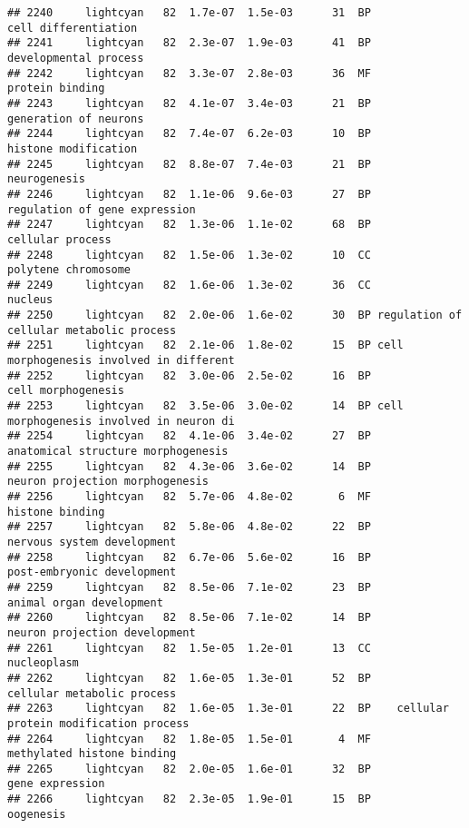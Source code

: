 \documentclass[]{article}
\begin{document}
\begin{verbatim}
## 2240     lightcyan   82  1.7e-07  1.5e-03      31  BP                     cell differentiation
## 2241     lightcyan   82  2.3e-07  1.9e-03      41  BP                    developmental process
## 2242     lightcyan   82  3.3e-07  2.8e-03      36  MF                          protein binding
## 2243     lightcyan   82  4.1e-07  3.4e-03      21  BP                    generation of neurons
## 2244     lightcyan   82  7.4e-07  6.2e-03      10  BP                     histone modification
## 2245     lightcyan   82  8.8e-07  7.4e-03      21  BP                             neurogenesis
## 2246     lightcyan   82  1.1e-06  9.6e-03      27  BP            regulation of gene expression
## 2247     lightcyan   82  1.3e-06  1.1e-02      68  BP                         cellular process
## 2248     lightcyan   82  1.5e-06  1.3e-02      10  CC                      polytene chromosome
## 2249     lightcyan   82  1.6e-06  1.3e-02      36  CC                                  nucleus
## 2250     lightcyan   82  2.0e-06  1.6e-02      30  BP regulation of cellular metabolic process
## 2251     lightcyan   82  2.1e-06  1.8e-02      15  BP cell morphogenesis involved in different
## 2252     lightcyan   82  3.0e-06  2.5e-02      16  BP                       cell morphogenesis
## 2253     lightcyan   82  3.5e-06  3.0e-02      14  BP cell morphogenesis involved in neuron di
## 2254     lightcyan   82  4.1e-06  3.4e-02      27  BP       anatomical structure morphogenesis
## 2255     lightcyan   82  4.3e-06  3.6e-02      14  BP          neuron projection morphogenesis
## 2256     lightcyan   82  5.7e-06  4.8e-02       6  MF                          histone binding
## 2257     lightcyan   82  5.8e-06  4.8e-02      22  BP               nervous system development
## 2258     lightcyan   82  6.7e-06  5.6e-02      16  BP               post-embryonic development
## 2259     lightcyan   82  8.5e-06  7.1e-02      23  BP                 animal organ development
## 2260     lightcyan   82  8.5e-06  7.1e-02      14  BP            neuron projection development
## 2261     lightcyan   82  1.5e-05  1.2e-01      13  CC                              nucleoplasm
## 2262     lightcyan   82  1.6e-05  1.3e-01      52  BP               cellular metabolic process
## 2263     lightcyan   82  1.6e-05  1.3e-01      22  BP    cellular protein modification process
## 2264     lightcyan   82  1.8e-05  1.5e-01       4  MF               methylated histone binding
## 2265     lightcyan   82  2.0e-05  1.6e-01      32  BP                          gene expression
## 2266     lightcyan   82  2.3e-05  1.9e-01      15  BP                                oogenesis

\end{verbatim}
\end{document}
